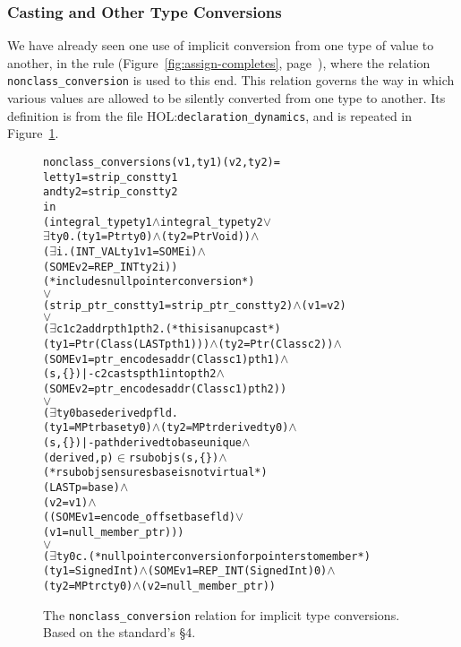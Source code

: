 \documentclass[11pt]{article}
\newcommand{\lbr}{\texttt{\{}}
\newcommand{\rbr}{\texttt{\}}}
\newcommand{\HOLfile}[1]{HOL:\texttt{#1}}
\begin{document}
\subsubsection{Casting and Other Type Conversions}
We have already seen one use of implicit conversion from one type of
value to another, in the rule 
(Figure~\ref{fig:assign-completes},
page~\pageref{fig:assign-completes}), where the relation
\texttt{nonclass_conversion} is used to this end.  This relation
governs the way in which various values are allowed to be silently
converted from one type to another.  Its definition is from the file
\HOLfile{declaration_dynamics}, and is repeated in
Figure~\ref{fig:nonclass-conversion}.
\begin{figure}
\begin{alltt}
  nonclass_conversion s (v1,ty1) (v2,ty2) =
    let ty1 = strip_const ty1
    and ty2 = strip_const ty2
    in
      (integral_type ty1 \(\land\) integral_type ty2 \(\lor\)
       \(\exists\)ty0. (ty1 = Ptr ty0) \(\land\) (ty2 = Ptr Void)) \(\land\)
      (\(\exists\)i. (INT_VAL ty1 v1 = SOME i) \(\land\)
           (SOME v2 = REP_INT ty2 i))
              (* includes null pointer conversion *)
         \(\lor\)
      (strip_ptr_const ty1 = strip_ptr_const ty2) \(\land\) (v1 = v2)
         \(\lor\)
      (\(\exists\)c1 c2 addr pth1 pth2.  (* this is an upcast *)
          (ty1 = Ptr (Class (LAST pth1))) \(\land\) (ty2 = Ptr (Class c2)) \(\land\)
          (SOME v1 = ptr_encode s addr (Class c1) pth1) \(\land\)
          (s,\lbr\rbr) |- c2 casts pth1 into pth2 \(\land\)
          (SOME v2 = ptr_encode s addr (Class c1) pth2))
         \(\lor\)
      (\(\exists\)ty0 base derived p fld.
          (ty1 = MPtr base ty0) \(\land\) (ty2 = MPtr derived ty0) \(\land\)
          (s,\lbr\rbr) |- path derived to base unique \(\land\)
          (derived, p) \(\in\) rsubobjs (s,\lbr\rbr) \(\land\)
             (* rsubobjs ensures base is not virtual *)
          (LAST p = base) \(\land\)
          (v2 = v1) \(\land\)
          ((SOME v1 = encode_offset base fld) \(\lor\)
           (v1 = null_member_ptr)))
         \(\lor\)
      (\(\exists\)ty0 c. (* null pointer conversion for pointers to member *)
          (ty1 = Signed Int) \(\land\) (SOME v1 = REP_INT (Signed Int) 0) \(\land\)
          (ty2 = MPtr c ty0) \(\land\) (v2 = null_member_ptr))
\end{alltt}
\caption[The \texttt{nonclass_conversion} Relation]{The
  \texttt{nonclass_conversion} relation for implicit type conversions.
  Based on the standard's \S4.}
\label{fig:nonclass-conversion}
\end{figure}
\end{document}

